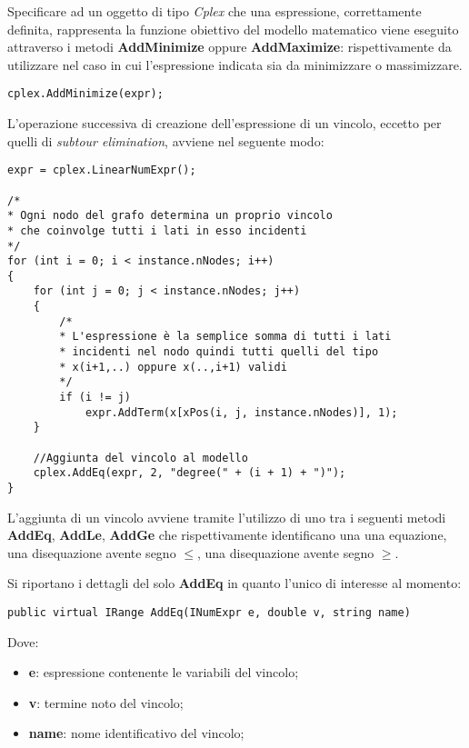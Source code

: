 \documentclass[11pt]{article}
\begin{document}
Specificare ad un oggetto di tipo \textit{Cplex} che una espressione, correttamente definita, rappresenta la funzione obiettivo del modello matematico viene eseguito attraverso i metodi \textbf{AddMinimize} oppure \textbf{AddMaximize}: rispettivamente da utilizzare nel caso in cui l'espressione indicata sia da minimizzare o massimizzare.

\begin{lstlisting}
cplex.AddMinimize(expr);
\end{lstlisting}

L'operazione successiva di creazione dell'espressione di un vincolo, eccetto per quelli di \textit{subtour elimination}, avviene nel seguente modo:

\begin{lstlisting}
expr = cplex.LinearNumExpr();

/*
* Ogni nodo del grafo determina un proprio vincolo
* che coinvolge tutti i lati in esso incidenti
*/
for (int i = 0; i < instance.nNodes; i++)
{
    for (int j = 0; j < instance.nNodes; j++)
    {
        /*
        * L'espressione è la semplice somma di tutti i lati
        * incidenti nel nodo quindi tutti quelli del tipo
        * x(i+1,..) oppure x(..,i+1) validi
        */
        if (i != j)
            expr.AddTerm(x[xPos(i, j, instance.nNodes)], 1);
    }
    
    //Aggiunta del vincolo al modello
    cplex.AddEq(expr, 2, "degree(" + (i + 1) + ")");
}
\end{lstlisting}

L'aggiunta di un vincolo avviene tramite l'utilizzo di uno tra i seguenti metodi \textbf{AddEq}, \textbf{AddLe}, \textbf{AddGe} che rispettivamente identificano una una equazione, una disequazione avente segno $\leq$, una disequazione avente segno $\geq$.

Si riportano i dettagli del solo \textbf{AddEq} in quanto l'unico di interesse al momento:

\begin{lstlisting}
public virtual IRange AddEq(INumExpr e, double v, string name)
\end{lstlisting}

Dove:

\begin{itemize}
    \item \textbf{e}: espressione contenente le variabili del vincolo;
    \item \textbf{v}: termine noto del vincolo;
    \item \textbf{name}: nome identificativo del vincolo;
\end{itemize}
\end{document}
